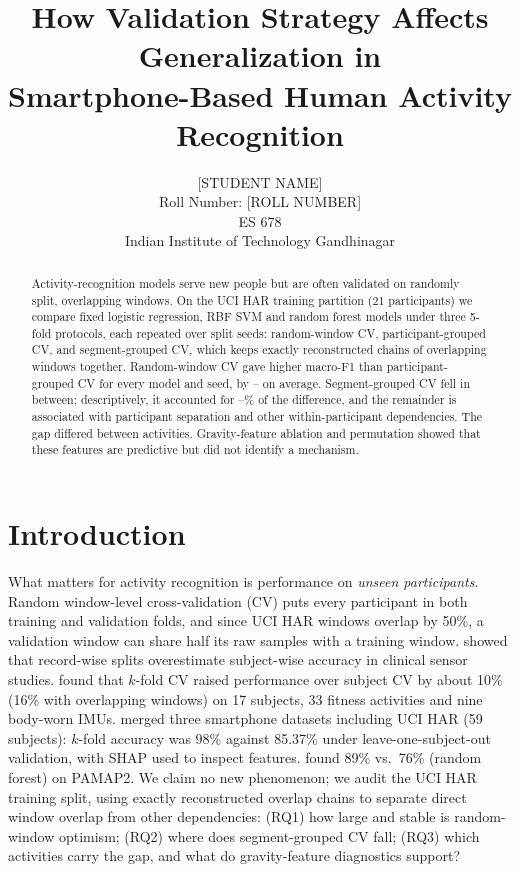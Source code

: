 \documentclass{article}
\title{How Validation Strategy Affects Generalization in\\Smartphone-Based Human Activity Recognition}
\author{%
  [STUDENT NAME] \\
  Roll Number: [ROLL NUMBER] \\
  ES 678 \\
  Indian Institute of Technology Gandhinagar
}
\begin{document}
\maketitle

\begin{abstract}
Activity-recognition models serve new people but are often validated on randomly split, overlapping windows. On the UCI HAR training partition (21 participants) we compare fixed logistic regression, RBF SVM and random forest models under three 5-fold protocols, each repeated over \Nnseeds{} split seeds: random-window CV, participant-grouped CV, and segment-grouped CV, which keeps exactly reconstructed chains of overlapping windows together. Random-window CV gave higher macro-F1 than participant-grouped CV for every model and seed, by \Ngapmodelmin--\Ngapmodelmax{} on average. Segment-grouped CV fell in between; descriptively, it accounted for \Noverlapsharemin--\Noverlapsharemax\% of the difference, and the remainder is associated with participant separation and other within-participant dependencies. The gap differed between activities. Gravity-feature ablation and permutation showed that these features are predictive but did not identify a mechanism.
\end{abstract}

\section{Introduction}
What matters for activity recognition is performance on \emph{unseen participants}. Random window-level cross-validation (CV) puts every participant in both training and validation folds, and since UCI HAR windows overlap by 50\%, a validation window can share half its raw samples with a training window. \citet{saeb2017} showed that record-wise splits overestimate subject-wise accuracy in clinical sensor studies. \citet{dehghani2019} found that $k$-fold CV raised performance over subject CV by about 10\% (16\% with overlapping windows) on 17 subjects, 33 fitness activities and nine body-worn IMUs. \citet{braganca2022} merged three smartphone datasets including UCI HAR (59 subjects): $k$-fold accuracy was 98\% against 85.37\% under leave-one-subject-out validation, with SHAP used to inspect features. \citet{rehman2024} found 89\% vs.\ 76\% (random forest) on PAMAP2. We claim no new phenomenon; we audit the UCI HAR training split, using exactly reconstructed overlap chains to separate direct window overlap from other dependencies: (RQ1) how large and stable is random-window optimism; (RQ2) where does segment-grouped CV fall; (RQ3) which activities carry the gap, and what do gravity-feature diagnostics support?
\end{document}
